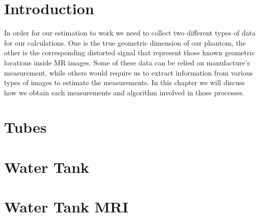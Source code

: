 \section{Introduction}
In order for our estimation to work we need to collect two different types of data for our calculations. 
One is the true geometric dimension of our phantom, the other is the corresponding distorted signal that
represent those known geometric locations inside MR images. Some of these data can be relied on manufacture's
measurement, while others would require us to extract information from various types of images to estimate the
measurements. In this chapter we will discuss how we obtain each measurements and algorithm involved in those
processes.

\section{Tubes}
\label{tubes}

\section{Water Tank}
\label{ct_tank}


\section{Water Tank MRI}
\label{mri_tank}

